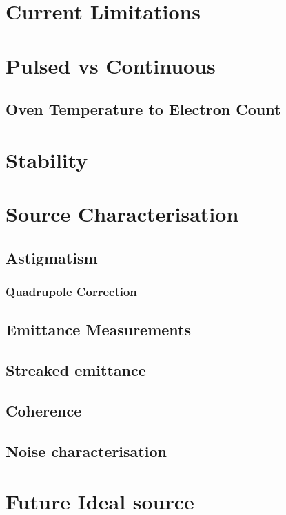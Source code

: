 \label{section:two_stage_ionisation}
\label{section:excess_energy}
\label{section:pulse_blaster}

\section{Current Limitations}

\section{Pulsed vs Continuous}

\subsection{Oven Temperature to Electron Count}

\section{Stability}\label{section:stability}

\section{Source Characterisation}

\subsection{Astigmatism}

\subsubsection{Quadrupole Correction}\label{section:quadrupole}

\subsection{Emittance Measurements}

\subsection{Streaked emittance}

\subsection{Coherence}

\subsection{Noise characterisation}

\section{Future Ideal source}